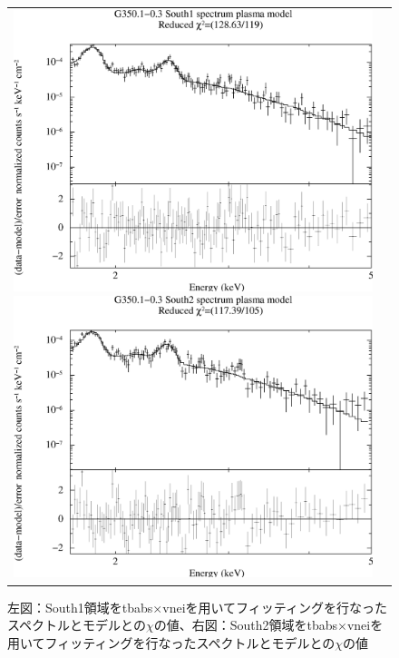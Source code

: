 \documentclass[a4j]{jarticle}%
\begin{document}
\begin{figure}[H]
\begin{center}
\begin{tabular}{cc}
\begin{minipage}{0.5\hsize}
\begin{center}
\includegraphics[scale=0.30]{./ps/South1_plasma.eps}
\end{center}
\end{minipage}
\begin{minipage}{0.5\hsize}
\begin{center}
\includegraphics[scale=0.30]{./ps/South2_plasma.eps}
\end{center}
\end{minipage}
\end{tabular}
\caption{左図：South1領域をtbabs$\times$vneiを用いてフィッティングを行なったスペクトルとモデルとの$\chi$の値、右図：South2領域をtbabs$\times$vneiを用いてフィッティングを行なったスペクトルとモデルとの$\chi$の値}
\label{fig:plasma_South}
\end{center}
\end{figure}
\end{document}
